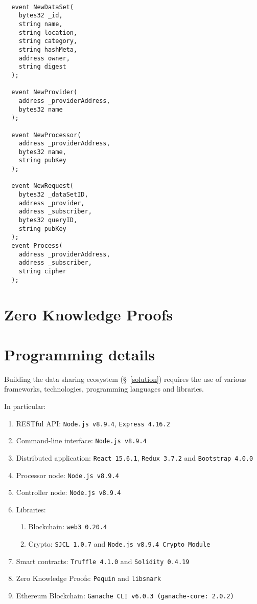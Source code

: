 \begin{lstlisting}[language=Solidity, caption={Data sharing application events}]

  event NewDataSet(
    bytes32 _id,
    string name,
    string location,
    string category,
    string hashMeta,
    address owner,
    string digest
  );

  event NewProvider(
    address _providerAddress,
    bytes32 name
  );

  event NewProcessor(
    address _providerAddress,
    bytes32 name,
    string pubKey
  );

  event NewRequest(
    bytes32 _dataSetID,
    address _provider,
    address _subscriber,
    bytes32 queryID,
    string pubKey
  );
  event Process(
    address _providerAddress,
    address _subscriber,
    string cipher
  );
\end{lstlisting}

\section{Zero Knowledge Proofs}
\label{implemenation:zkp}

\section{Programming details}
\label{implemenation:details}

Building the data sharing ecosystem (§~\ref{solution}) requires the use of various frameworks, technologies, programming languages and libraries.

In particular:

\begin{enumerate}
  \item RESTful API: \verb|Node.js v8.9.4|, \verb|Express 4.16.2|
  \item Command-line interface: \verb|Node.js v8.9.4|
  \item Distributed application: \verb|React 15.6.1|, \verb|Redux 3.7.2| and \verb|Bootstrap 4.0.0|
  \item Processor node: \verb|Node.js v8.9.4|
  \item Controller node: \verb|Node.js v8.9.4|
  \item Libraries:
    \begin{enumerate}
      \item Blockchain: \verb|web3 0.20.4|
      \item Crypto: \verb|SJCL 1.0.7| and \verb|Node.js v8.9.4 Crypto Module|
    \end{enumerate}
  \item Smart contracts: \verb|Truffle 4.1.0| and \verb|Solidity 0.4.19|
  \item Zero Knowledge Proofs: \verb|Pequin| and \verb|libsnark|
  \item Ethereum Blockchain: \verb|Ganache CLI v6.0.3 (ganache-core: 2.0.2)|
\end{enumerate}

